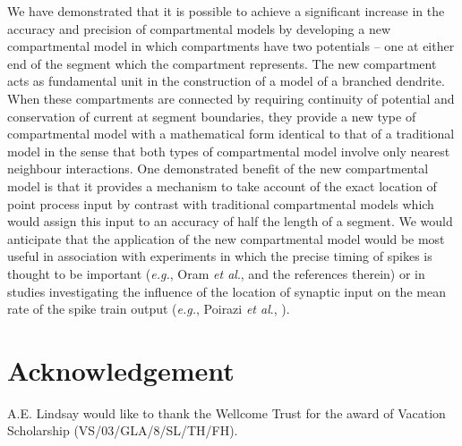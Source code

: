 We have demonstrated that it is possible to achieve a significant
increase in the accuracy and precision of compartmental models by
developing a new compartmental model in which compartments have
two potentials -- one at either end of the segment which the
compartment represents. The new compartment acts as fundamental
unit in the construction of a model of a branched dendrite. When
these compartments are connected by requiring continuity of
potential and conservation of current at segment boundaries, they
provide a new type of compartmental model with a mathematical form
identical to that of a traditional model in the sense that both
types of compartmental model involve only nearest neighbour
interactions. One demonstrated benefit of the new compartmental
model is that it provides a mechanism to take account of the exact
location of point process input by contrast with traditional
compartmental models which would assign this input to an accuracy
of half the length of a segment. We would anticipate that the
application of the new compartmental model would be most useful in
association with experiments in which the precise timing of spikes
is thought to be important (\emph{e.g.}, Oram \emph{et al}.,
\cite{Oram99} and the references therein) or in studies
investigating the influence of the location of synaptic input on
the mean rate of the spike train output (\emph{e.g.}, Poirazi
\emph{et al}., \cite{Poirazi03}).

\section*{Acknowledgement}

A.E. Lindsay would like to thank the Wellcome Trust for the award
of Vacation Scholarship (VS/03/GLA/8/SL/TH/FH).
